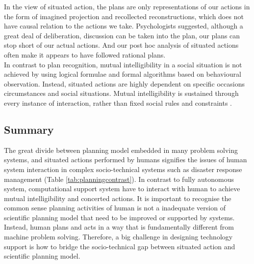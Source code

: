 In the view of situated action, the plans are only representations of our actions in the form of imagined projection and recollected reconstructions, which does not have causal relation to the actions we take. Psychologists \cite{Mead1934} suggested, although a great deal of deliberation, discussion can be taken into the plan, our plans can stop short of our actual actions. And our post hoc analysis of situated actions often make it appears to have followed rational plans. \\

In contrast to plan recognition, mutual intelligibility in a social situation is not achieved by using logical formulae and formal algorithms based on behavioural observation. Instead, situated actions are highly dependent on specific occasions circumstances and social situations. Mutual intelligibility is sustained through every instance of interaction, rather than fixed social rules and constraints \cite{Suchman1987}.\\


\subsection{Summary}
The great divide between planning model embedded in many problem solving systems, and situated actions performed by humans signifies the issues of human system interaction in complex socio-technical systems such as disaster response management (Table \ref{tab:planningcontrast}). In contrast to fully autonomous system, computational support system have to interact with human to achieve mutual intelligibility and concerted actions. It is important to recognise the common sense planning activities of human is not a inadequate version of scientific planning model that need to be improved or supported by systems. Instead, human plans and acts in a way that is fundamentally different from machine problem solving. Therefore, a big challenge in designing technology support is how to bridge the socio-technical gap between situated action and scientific planning model.\\

